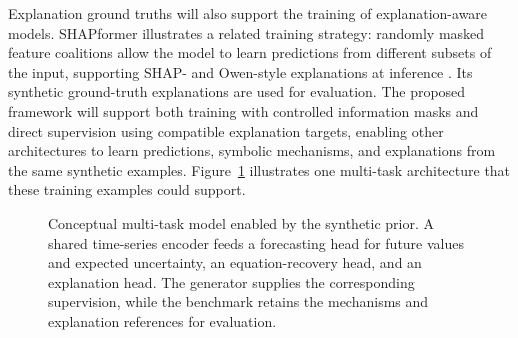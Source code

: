 \begin{samepage}
Explanation ground truths will also support the training of explanation-aware
models. SHAPformer illustrates a related training strategy:
randomly masked feature coalitions allow the model to learn predictions from
different subsets of the input, supporting SHAP- and Owen-style explanations
at inference \citep{hertel2026shapformer}. Its synthetic ground-truth
explanations are used for evaluation. The proposed framework will support both
training with controlled information masks and direct supervision using
compatible explanation targets, enabling other architectures to learn
predictions, symbolic mechanisms, and explanations from the same synthetic
examples. Figure~\ref{fig:dual-prior-benchmark-motivation} illustrates one
multi-task architecture that these training examples could support.

\begin{figure}[H]
\centering
{}
\caption{Conceptual multi-task model enabled by the synthetic prior. A shared
time-series encoder feeds a forecasting head for future values and expected
uncertainty, an equation-recovery head, and an explanation head. The generator
supplies the corresponding supervision, while the benchmark retains the
mechanisms and explanation references for evaluation.}
\label{fig:dual-prior-benchmark-motivation}
\end{figure}
\end{samepage}

